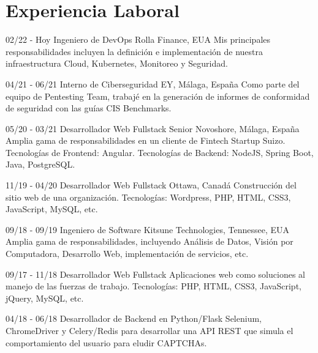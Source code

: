 \documentclass[]{friggeri-cv}
\begin{document}
\section{Experiencia Laboral}
\begin{entrylist}
  \entry
    {02/22 - Hoy}
    {Ingeniero de DevOps}
    {Rolla Finance, EUA}
    {Mis principales responsabilidades incluyen la definición e implementación de nuestra infraestructura Cloud, Kubernetes, Monitoreo y Seguridad.\\}

  \entry
    {04/21 - 06/21}
    {Interno de Ciberseguridad}
    {EY, Málaga, España}
    {Como parte del equipo de Pentesting Team, trabajé en la generación de informes de conformidad de seguridad con las guías CIS Benchmarks.\\}

  \entry
    {05/20 - 03/21}
    {Desarrollador Web Fullstack Senior}
    {Novoshore, Málaga, España}
    {Amplia gama de responsabilidades en un cliente de Fintech Startup Suizo. Tecnologías de Frontend: Angular. Tecnologías de Backend: NodeJS, Spring Boot, Java, PostgreSQL.\\}

  \entry
    {11/19 - 04/20}
    {Desarrollador Web Fullstack}
    {Ottawa, Canadá} %
    {Construcción del sitio web de una organización. Tecnologías: Wordpress, PHP, HTML, CSS3, JavaScript, MySQL, etc.\\}

  \entry
    {09/18 - 09/19}
    {Ingeniero de Software}
    {Kitsune Technologies, Tennessee, EUA}
    {Amplia gama de responsabilidades, incluyendo Análisis de Datos, Visión por Computadora, Desarrollo Web, implementación de servicios, etc.\\}

  \entry
    {09/17 - 11/18}
    {Desarrollador Web Fullstack}
    {}
    {Aplicaciones web como soluciones al manejo de las fuerzas de trabajo. Tecnologías: PHP, HTML, CSS3, JavaScript, jQuery, MySQL, etc.\\}
    
  \entry
    {04/18 - 06/18}
    {Desarrollador de Backend en Python/Flask}
    {} 
    {Selenium, ChromeDriver y Celery/Redis para desarrollar una API REST que simula el comportamiento del usuario para eludir CAPTCHAs.\\}    
    

\end{entrylist}
\end{document}

